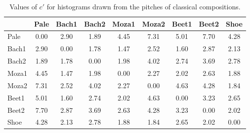 \begin{table}[h!]
\begin{center}
\begin{tabular}{| l | c | c | c | c | c | c | c | c |}\hline
 & Pale & Bach1 & Bach2 & Moza1 & Moza2 & Beet1 & Beet2 & Shoe \\\hline
Pale & 0.00  & 2.90  & 1.89  & 4.45  & 7.31  & 5.01  & 7.70  & 4.28 \\\hline
Bach1 & 2.90  & 0.00  & 1.78  & 1.47  & 2.52  & 1.60  & 2.87  & 2.13 \\\hline
Bach2 & 1.89  & 1.78  & 0.00  & 1.98  & 4.02  & 2.74  & 3.69  & 2.78 \\\hline
Moza1 & 4.45  & 1.47  & 1.98  & 0.00  & 2.27  & 2.02  & 2.63  & 1.88 \\\hline
Moza2 & 7.31  & 2.52  & 4.02  & 2.27  & 0.00  & 4.63  & 4.28  & 1.84 \\\hline
Beet1 & 5.01  & 1.60  & 2.74  & 2.02  & 4.63  & 0.00  & 3.23  & 2.65 \\\hline
Beet2 & 7.70  & 2.87  & 3.69  & 2.63  & 4.28  & 3.23  & 0.00  & 2.02 \\\hline
Shoe & 4.28  & 2.13  & 2.78  & 1.88  & 1.84  & 2.65  & 2.02  & 0.00 \\\hline
\end{tabular}
\caption{Values of $c'$ for histograms drawn from the pitches of classical compositions.}
\end{center}
\end{table}